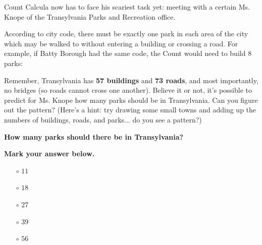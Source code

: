 


Count Calcula now has to face his scariest task yet: meeting
with a certain Ms. Knope of the Transylvania Parks and Recreation office.

According to city code, there must be exactly one park in each area
of the city which may be walked to without entering a building or
crossing a road. For example, if Batty Borough had the same code, the Count
would need to build \(8\) parks:


\begin{center}
\end{center}

Remember, Transylvania has \textbf{57 buildings} and \textbf{73 roads},
and most importantly, no bridges (so roads cannot cross one another).
Believe it or not, it's possible to predict for Ms. Knope how many parks
should be in Transylvania. Can you figure out the pattern? (Here's a hint:
try drawing some small towns and adding up the numbers of buildings, roads,
and parks... do you see a pattern?)

\textbf{How many parks should there be in Transylvania?}

\vspace{2em}

\textbf{Mark your answer below.}

\begin{itemize}
  \item[\Huge\(\circ\)] \(11\)
  \item[\Huge\(\circ\)] \(18\)
  \item[\Huge\(\circ\)] \(27\)
  \item[\Huge\(\circ\)] \(39\)
  \item[\Huge\(\circ\)] \(56\)
\end{itemize}
